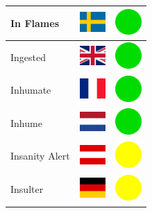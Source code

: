 \documentclass[12pt, a4paper, twoside]{report}
\begin{document}
\begin{center}
\begin{longtable}{|p{5cm}|p{2cm}|p{2cm}|}
 In Flames                                                  & \includegraphics[width=1cm]{../img/flags/se} &   \includegraphics[width=1cm]{../likes/y} \\ \hline
 Ingested                                                   & \includegraphics[width=1cm]{../img/flags/gb} &   \includegraphics[width=1cm]{../likes/y} \\ \hline
 Inhumate                                                   & \includegraphics[width=1cm]{../img/flags/fr} &   \includegraphics[width=1cm]{../likes/y} \\ \hline
 Inhume                                                     & \includegraphics[width=1cm]{../img/flags/nl} &   \includegraphics[width=1cm]{../likes/y} \\ \hline
 Insanity Alert                                             & \includegraphics[width=1cm]{../img/flags/at} &   \includegraphics[width=1cm]{../likes/m} \\ \hline
 Insulter                                                   & \includegraphics[width=1cm]{../img/flags/de} &   \includegraphics[width=1cm]{../likes/m} \\ \hline

\end{longtable}
\end{center}
\end{document}
